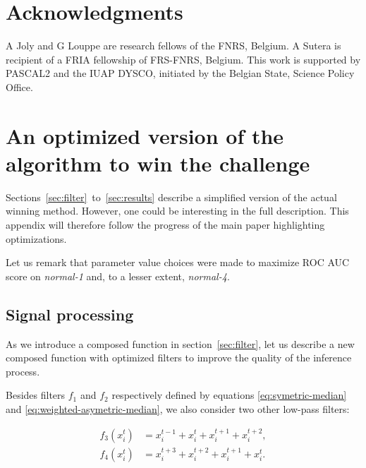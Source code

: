 \documentclass[wcp]{jmlr}
\begin{document}


\section*{Acknowledgments}
A Joly and G Louppe are research fellows of the FNRS, Belgium.  A Sutera is
recipient of a FRIA fellowship of FRS-FNRS, Belgium. This work is supported by
PASCAL2 and the IUAP DYSCO, initiated by the Belgian State, Science Policy
Office.



\newpage
\clearpage



\newpage
\clearpage

\appendix


\section{An optimized version of the algorithm to win the challenge}
\label{app:optimized}

Sections~\ref{sec:filter}~to~\ref{sec:results} describe a simplified version
of the actual winning method. However, one could be interesting in the full
description. This appendix will therefore follow the progress of the main
paper highlighting optimizations.

Let us remark that parameter value choices were made to maximize ROC AUC score
on \textit{normal-1} and, to a lesser extent, \textit{normal-4}.

\subsection*{Signal processing}

As we introduce a composed function in section~\ref{sec:filter}, let us describe a new composed function with optimized filters to improve the quality of the inference process.


Besides filters
$f_1$ and $f_2$ respectively defined by equations \ref{eq:symetric-median} and \ref{eq:weighted-asymetric-median}, we also consider two other low-pass
filters:

\begin{align}
f_3(x^t_i) &= x^{t-1}_i + x^{t}_i + x^{t+1}_i + x^{t+2}_i \label{eq:asymetric-median-forward}, \\
f_4(x^t_i) &= x^{t+3}_i + x^{t+2}_i + x^{t+1}_i + x_i^t.
\label{eq:asymetric-median}
\end{align}
\end{document}
